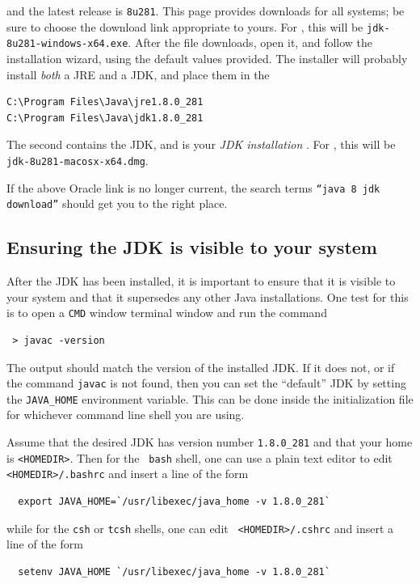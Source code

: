 and the latest release is {\tt 8u281}. This page provides downloads
for all systems; be sure to choose the download link appropriate to
yours. 
\ifWindows
For \SYSTEM{}, this will be {\tt jdk-8u281-windows-x64.exe}.  After
the file downloads, open it, and follow the installation wizard, using
the default values provided. The installer will probably install {\it
both} a JRE and a JDK, and place them in the \directories{}
\begin{verbatim}
C:\Program Files\Java\jre1.8.0_281
C:\Program Files\Java\jdk1.8.0_281
\end{verbatim}
The second contains the JDK, and is your {\it JDK installation} \directory{}.
\fi
\ifMacOS
For \SYSTEM{}, this will be {\tt jdk-8u281-macosx-x64.dmg}.
\fi

If the above Oracle link is no longer current, the search terms
{\tt ``java 8 jdk download''} should get you to the right place.

\subsection{Ensuring the JDK is visible to your system}
\label{MakingJDKVisible}

After the JDK has been installed, it is important to ensure that it is
visible to your system and that it supersedes any other Java
installations. One test for this is to open a
\ifWindows
{\tt CMD} window
\else
terminal window
\fi
and run the command 
\begin{verbatim}
 > javac -version
\end{verbatim}
The output should match the version of the installed JDK. If it does
not, or if the command {\tt javac} is not found,
\ifMacOS %
then you can set the ``default'' JDK by setting the {\tt JAVA\_HOME}
environment variable.  This can be done inside the
initialization file for whichever command line shell you are using.

Assume that the desired JDK has version number {\tt 1.8.0\_281} and
that your home \directory{} is {\tt <HOMEDIR>}.  Then for the {\tt
bash} shell, one can use a plain text editor to edit {\tt
<HOMEDIR>/.bashrc} and insert a line of the form
\begin{verbatim}
  export JAVA_HOME=`/usr/libexec/java_home -v 1.8.0_281`
\end{verbatim}
while for the {\tt csh} or {\tt tcsh} shells, one can edit {\tt
<HOMEDIR>/.cshrc} and insert a line of the form
\begin{verbatim}
  setenv JAVA_HOME `/usr/libexec/java_home -v 1.8.0_281`
\end{verbatim}

